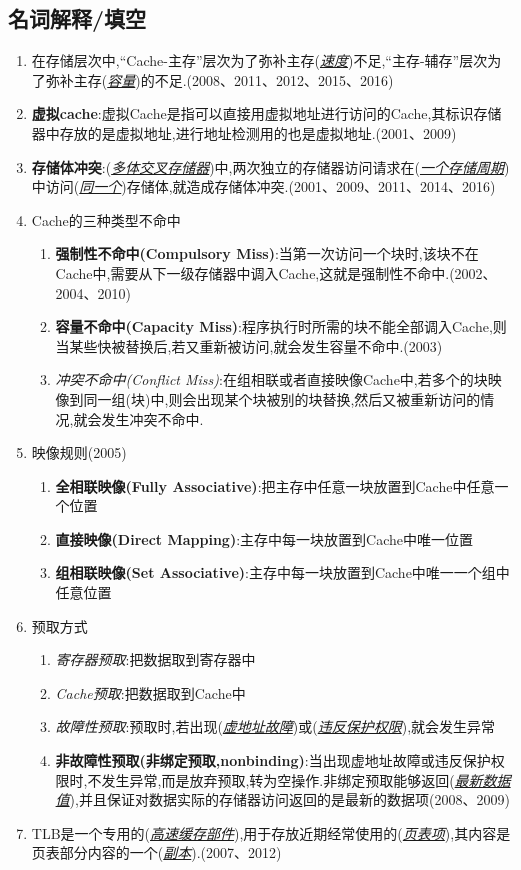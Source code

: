 \documentclass[a4paper]{ctexart}
\newcommand{\blank}[1]{(\emph{\underline{#1}})}
\begin{document}
\subsection{名词解释/填空}
\begin{enumerate}
  \item 在存储层次中,“Cache-主存”层次为了弥补主存\blank{速度}不足,“主存-辅存”层次为了弥补主存\blank{容量}的不足.(2008、2011、2012、2015、2016)
  \item \textbf{虚拟cache}:虚拟Cache是指可以直接用虚拟地址进行访问的Cache,其标识存储器中存放的是虚拟地址,进行地址检测用的也是虚拟地址.(2001、2009)
  \item \textbf{存储体冲突}:\blank{多体交叉存储器}中,两次独立的存储器访问请求在\blank{一个存储周期}中访问\blank{同一个}存储体,就造成存储体冲突.(2001、2009、2011、2014、2016)
  \item Cache的三种类型不命中
  \begin{enumerate}
    \item \textbf{强制性不命中(Compulsory Miss)}:当第一次访问一个块时,该块不在Cache中,需要从下一级存储器中调入Cache,这就是强制性不命中.(2002、2004、2010)
    \item \textbf{容量不命中(Capacity Miss)}:程序执行时所需的块不能全部调入Cache,则当某些快被替换后,若又重新被访问,就会发生容量不命中.(2003)
    \item \emph{冲突不命中(Conflict Miss)}:在组相联或者直接映像Cache中,若多个的块映像到同一组(块)中,则会出现某个块被别的块替换,然后又被重新访问的情况,就会发生冲突不命中.
  \end{enumerate}
  \item 映像规则(2005)
  \begin{enumerate}
    \item \textbf{全相联映像(Fully Associative)}:把主存中任意一块放置到Cache中任意一个位置
    \item \textbf{直接映像(Direct Mapping)}:主存中每一块放置到Cache中唯一位置
    \item \textbf{组相联映像(Set Associative)}:主存中每一块放置到Cache中唯一一个组中任意位置
  \end{enumerate}
  \item 预取方式
  \begin{enumerate}
    \item \emph{寄存器预取}:把数据取到寄存器中
    \item \emph{Cache预取}:把数据取到Cache中
    \item \emph{故障性预取}:预取时,若出现\blank{虚地址故障}或\blank{违反保护权限},就会发生异常
    \item \textbf{非故障性预取(非绑定预取,nonbinding)}:当出现虚地址故障或违反保护权限时,不发生异常,而是放弃预取,转为空操作.非绑定预取能够返回\blank{最新数据值},并且保证对数据实际的存储器访问返回的是最新的数据项(2008、2009)
  \end{enumerate}
  \item TLB是一个专用的(\emph{\underline{高速缓存部件}}),用于存放近期经常使用的(\emph{\underline{页表项}}),其内容是页表部分内容的一个(\emph{\underline{副本}}).(2007、2012)
\end{enumerate}
\end{document}
